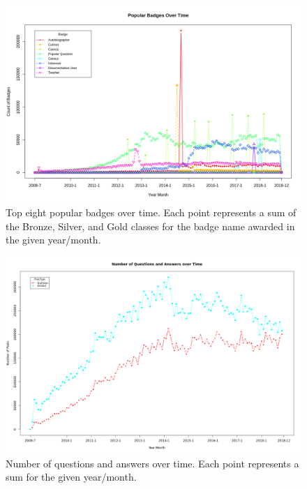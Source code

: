 \documentclass[a4paper,11pt, notitlepage]{report}
\theoremstyle{definition}
\numberwithin{equation}{section}		%
\begin{document}
\begin{figure}[ht]
    \centering
    \includegraphics[angle=270,width=5.5in]{figures/popular_badges_over_time.png}
    \caption{Top eight popular badges over time. Each point represents a sum of the Bronze, Silver, and Gold classes for the badge name awarded in the given year/month.}
    \label{fig:popular-badges-over-time}
\end{figure}

\begin{figure}[ht]
    \centering
    \includegraphics[angle=270,width=5.5in]{figures/num_q_and_a_over_time.png}
    \caption{Number of questions and answers over time. Each point represents a sum for the given year/month.}
    \label{fig:q-and-a-over-time}
\end{figure}
\end{document}
